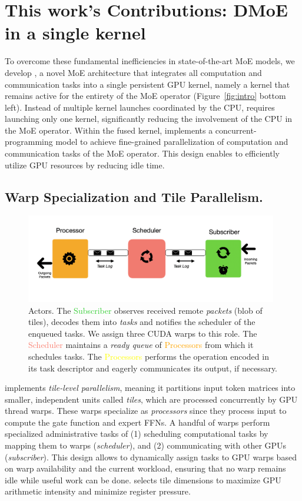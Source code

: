 \section{This work's Contributions: DMoE in a single kernel}\label{sec:contributions:-moe-operator-in-a-single-kernel}
To overcome these fundamental inefficiencies in state-of-the-art MoE models,
we develop \sysname, a novel MoE architecture that integrates all computation
and communication tasks into a single persistent GPU kernel, namely
a kernel that remains active for the entirety of the MoE operator
(Figure~\ref{fig:intro} bottom left).
Instead of multiple kernel launches coordinated by the CPU,
\sysname requires launching only one kernel,
significantly reducing the involvement of the CPU in the MoE operator.
Within the fused kernel, \sysname implements a concurrent-programming
model to achieve fine-grained parallelization
of computation and communication tasks of the MoE operator.
This design enables \sysname to efficiently utilize GPU resources by reducing idle time.
\subsection{Warp Specialization and Tile Parallelism.}\label{subsec:wstp}
\begin{figure}[!ht]
    \centering
    \includegraphics[width=0.98\textwidth, keepaspectratio]{figures/flash_actors}
    \caption{\sysname Actors. The \textcolor{LimeGreen}{Subscriber} observes received remote \emph{packets}
    (blob of tiles), decodes them into \emph{tasks} and notifies the scheduler of the enqueued tasks.
    We assign three CUDA warps to this role.
    The \textcolor{Salmon}{Scheduler} maintains a \emph{ready queue} of \textcolor{Orange}{Processors}
    from which it schedules tasks. The \textcolor{Yellow}{Processors} performs the operation encoded in its task
    descriptor and eagerly communicates its output, if necessary.}
    \label{fig:flash_actors}
\end{figure}
\sysname implements \emph{tile-level parallelism},
meaning it partitions input token matrices into smaller,
independent units called \emph{tiles},
which are processed concurrently by GPU thread warps.
These warps specialize as \emph{processors}
since they process input to compute the gate function and expert FFNs.
A handful of warps perform specialized administrative tasks of
(1) scheduling computational tasks by mapping them to warps (\emph{scheduler}), and
(2) communicating with other GPUs (\emph{subscriber}).
This design allows \sysname to dynamically assign tasks to GPU warps based
on warp availability and the current workload,
ensuring that no warp remains idle while useful work can be done.
\sysname selects tile dimensions to maximize GPU arithmetic intensity and
minimize register pressure.
